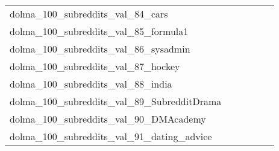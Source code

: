 {\begin{longtable}{m{6cm}m{1.7cm}m{1.7cm}m{1.7cm}m{1.7cm}m{1.7cm}}
	dolma\_100\_subreddits\_val\_84\_cars  & \colorbox[HTML]{ffffe5}{\makebox[\mywidth][c]{22.57}} & \colorbox[HTML]{e4f4ab}{\makebox[\mywidth][c]{21.41}} & \colorbox[HTML]{ffffe5}{\makebox[\mywidth][c]{22.73}} & \colorbox[HTML]{def2a6}{\makebox[\mywidth][c]{21.38}} & \colorbox[HTML]{77c578}{\makebox[\mywidth][c]{21.15}}\\
	dolma\_100\_subreddits\_val\_85\_formula1  & \colorbox[HTML]{ffffe5}{\makebox[\mywidth][c]{23.85}} & \colorbox[HTML]{cae99c}{\makebox[\mywidth][c]{22.65}} & \colorbox[HTML]{ffffe5}{\makebox[\mywidth][c]{24.09}} & \colorbox[HTML]{dcf1a5}{\makebox[\mywidth][c]{22.71}} & \colorbox[HTML]{77c578}{\makebox[\mywidth][c]{22.49}}\\
	dolma\_100\_subreddits\_val\_86\_sysadmin  & \colorbox[HTML]{ffffe5}{\makebox[\mywidth][c]{24.23}} & \colorbox[HTML]{def2a6}{\makebox[\mywidth][c]{22.90}} & \colorbox[HTML]{ffffe5}{\makebox[\mywidth][c]{24.41}} & \colorbox[HTML]{e8f6ae}{\makebox[\mywidth][c]{22.96}} & \colorbox[HTML]{77c578}{\makebox[\mywidth][c]{22.64}}\\
	dolma\_100\_subreddits\_val\_87\_hockey  & \colorbox[HTML]{ffffe5}{\makebox[\mywidth][c]{21.46}} & \colorbox[HTML]{9bd587}{\makebox[\mywidth][c]{20.26}} & \colorbox[HTML]{ffffe5}{\makebox[\mywidth][c]{21.74}} & \colorbox[HTML]{d0ec9e}{\makebox[\mywidth][c]{20.37}} & \colorbox[HTML]{77c578}{\makebox[\mywidth][c]{20.20}}\\
	dolma\_100\_subreddits\_val\_88\_india  & \colorbox[HTML]{ffffe5}{\makebox[\mywidth][c]{24.15}} & \colorbox[HTML]{dbf1a4}{\makebox[\mywidth][c]{22.92}} & \colorbox[HTML]{ffffe5}{\makebox[\mywidth][c]{24.42}} & \colorbox[HTML]{f5fbb7}{\makebox[\mywidth][c]{23.08}} & \colorbox[HTML]{77c578}{\makebox[\mywidth][c]{22.68}}\\
	dolma\_100\_subreddits\_val\_89\_SubredditDrama  & \colorbox[HTML]{ffffe5}{\makebox[\mywidth][c]{19.14}} & \colorbox[HTML]{c5e799}{\makebox[\mywidth][c]{18.26}} & \colorbox[HTML]{ffffe5}{\makebox[\mywidth][c]{19.63}} & \colorbox[HTML]{d0ec9e}{\makebox[\mywidth][c]{18.29}} & \colorbox[HTML]{77c578}{\makebox[\mywidth][c]{18.12}}\\
	dolma\_100\_subreddits\_val\_90\_DMAcademy  & \colorbox[HTML]{ffffe5}{\makebox[\mywidth][c]{27.77}} & \colorbox[HTML]{d8efa2}{\makebox[\mywidth][c]{26.31}} & \colorbox[HTML]{ffffe5}{\makebox[\mywidth][c]{28.38}} & \colorbox[HTML]{e5f5ac}{\makebox[\mywidth][c]{26.41}} & \colorbox[HTML]{77c578}{\makebox[\mywidth][c]{26.00}}\\
	dolma\_100\_subreddits\_val\_91\_dating\_advice  & \colorbox[HTML]{ffffe5}{\makebox[\mywidth][c]{20.18}} & \colorbox[HTML]{a4d98a}{\makebox[\mywidth][c]{19.27}} & \colorbox[HTML]{ffffe5}{\makebox[\mywidth][c]{20.42}} & \colorbox[HTML]{e3f4aa}{\makebox[\mywidth][c]{19.40}} & \colorbox[HTML]{77c578}{\makebox[\mywidth][c]{19.21}}\\

\end{longtable}}
